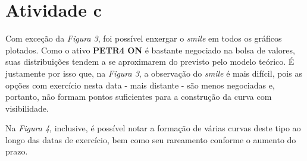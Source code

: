 \documentclass{article}
\begin{document}
\section*{Atividade c}

Com exceção da \emph{Figura 3}, foi possível enxergar o \emph{smile} em todos os gráficos plotados.
Como o ativo \textbf{PETR4 ON} é bastante negociado na bolsa de valores, suas distribuições tendem a se aproximarem do previsto pelo modelo teórico.
É justamente por isso que, na \emph{Figura 3}, a observação do \emph{smile} é mais difícil, pois as opções com exercício nesta data - mais distante - são menos negociadas e, portanto, não formam pontos suficientes para a construção da curva com visibilidade.

Na \emph{Figura 4}, inclusive, é possível notar a formação de várias curvas deste tipo ao longo das datas de exercício, bem como seu rareamento conforme o aumento do prazo.
\end{document}
